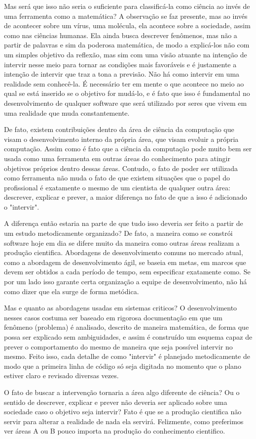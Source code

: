 Mas será que isso não seria o suficiente para classificá-la como ciência ao invés de uma ferramenta como a matemática? A observação se faz presente, mas ao invés de acontecer sobre um vírus, uma molécula, ela acontece sobre a sociedade, assim como nas ciências humanas. Ela ainda busca descrever fenômenos, mas não a partir de palavras e sim da poderosa matemática, de modo a explicá-los não com um simples objetivo da reflexão, mas sim com uma visão atuante na intenção de intervir nesse meio para tornar as condições mais favoráveis e é justamente a intenção de intervir que traz a tona a previsão. Não há como intervir em uma realidade sem conhecê-la. É necessário ter em mente o que acontece no meio ao qual se está inserido se o objetivo for mudá-lo, e é fato que isso é fundamental no desenvolvimento de qualquer software que será utilizado por seres que vivem em uma realidade que muda constantemente.

De fato, existem contribuições dentro da área de ciência da computação que visam o desenvolvimento interno da própria área, que visam evoluir a própria computação. Assim como é fato que a ciência da computação pode muito bem ser usada como uma ferramenta em outras áreas do conhecimento para atingir objetivos próprios dentro dessas áreas. Contudo, o fato de poder ser utilizada como ferramenta não muda o fato de que existem situações que o papel do profissional é exatamente o mesmo de um cientista de qualquer outra área: descrever, explicar e prever, a maior diferença no fato de que a isso é adicionado o "intervir".

A diferença então estaria na parte de que tudo isso deveria ser feito a partir de um estudo metodicamente organizado? De fato, a maneira como se constrói software hoje em dia se difere muito da maneira como outras áreas realizam a produção cientifica. Abordagens de desenvolvimento comuns no mercado atual, como a abordagem de desenvolvimento ágil, se baseia em metas, em marcos que devem ser obtidos a cada período de tempo, sem especificar exatamente como. Se por um lado isso garante certa organização a equipe de desenvolvimento, não há como dizer que ela surge de forma metódica.

Mas e quanto as abordagens usadas em sistemas criticos? O desenvolvimento nesses casos costuma ser baseado em rigorosa documentação em que um fenômeno (problema) é analisado, descrito de maneira matemática, de forma que possa ser explicado sem ambiguidades, e assim é construído um esquema capaz de prever o comportamento do mesmo de maneira que seja possível intervir no mesmo. Feito isso, cada detalhe de como "intervir" é planejado metodicamente de modo que a primeira linha de código só seja digitada no momento que o plano estiver claro e revisado diversas vezes.

O fato de buscar a intervenção tornaria a área algo diferente de ciência? Ou o sentido de descrever, explicar e prever não deveria ser aplicado sobre uma sociedade caso o objetivo seja intervir? Fato é que se a produção cientifica não servir para alterar a realidade de nada ela servirá. Felizmente, como preferimos ver áreas A ou B pouco importa na produção do conhecimento cientifico.